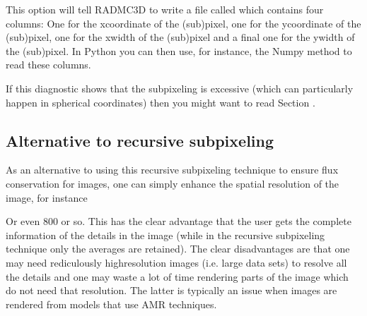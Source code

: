 \documentclass[letterpaper,10pt,english]{sphinxmanual}
\begin{document}
\begin{sphinxVerbatim}[commandchars=\\\{\}]
    
\end{sphinxVerbatim}

This  option will tell RADMC\sphinxhyphen{}3D to write a
file called  which contains four
columns: One for the x\sphinxhyphen{}coordinate of the (sub\sphinxhyphen{})pixel, one for the
y\sphinxhyphen{}coordinate of the (sub\sphinxhyphen{})pixel, one for the x\sphinxhyphen{}width of the (sub\sphinxhyphen{})pixel
and a final one for the y\sphinxhyphen{}width of the (sub\sphinxhyphen{})pixel. In Python you can
then use, for instance, the Numpy  method to
read these columns.

If this diagnostic shows that the subpixeling is excessive (which can
particularly happen in spherical coordinates) then you might want to
read Section {\hyperref[\detokenize{imagesspectra:sec-rec-subpixel-spher-coord}]{}}.


\subsection{Alternative to recursive sub\sphinxhyphen{}pixeling}
\label{\detokenize{imagesspectra:alternative-to-recursive-sub-pixeling}}
As an alternative to using this recursive sub\sphinxhyphen{}pixeling technique to ensure
flux conservation for images, one can simply enhance the spatial resolution
of the image, for instance

\begin{sphinxVerbatim}[commandchars=\\\{\}]
     
\end{sphinxVerbatim}

Or even 800 or so. This has the clear advantage that the user gets the complete
information of the details in the image (while in the recursive sub\sphinxhyphen{}pixeling
technique only the averages are retained). The clear disadvantages are that
one may need rediculously high\sphinxhyphen{}resolution images (i.e. large data sets) to
resolve all the details and one may waste a lot of time rendering parts of
the image which do not need that resolution. The latter is typically an
issue when images are rendered from models that use AMR techniques.
\end{document}
